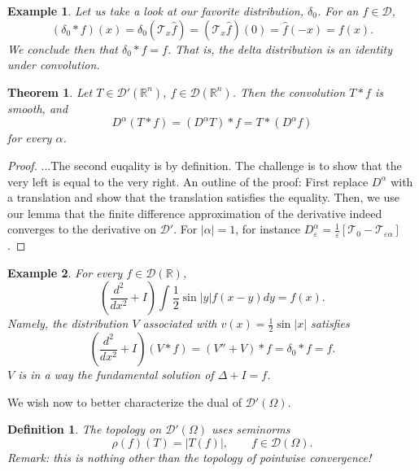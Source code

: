 \documentclass[letterpaper,twoside,11pt]{article}
\theoremstyle{mystyle}
\newtheorem{theorem}{Theorem}[section]
\newtheorem{definition}{Definition}[section]
\newtheorem*{example}{Example}
\newcommand{\R}{{\mathbb R}}
\newcommand{\DD}{\mathcal D}
\newcommand{\cg}{\color{gray}}
\newcommand{\cbk}{\color{black}}
\begin{document}
  \begin{example}
    Let us take a look at our favorite distribution, $\delta_0$. For an $f \in \DD$, 
    \[\left( \delta_0 \ast f \right)(x) = \delta_0\left( \mathcal T_x \hat f \right)  = \left( \mathcal T_x \hat f \right)(0) = \hat f (-x) = f(x) .\]
    We conclude then that $\delta_0 \ast f = f$. That is, the delta distribution is an identity under convolution. 
  \end{example}

\begin{tcolorbox}[colback=red!5!white,colframe=red!75!black]
\begin{theorem}
  Let $T \in \DD'(\R^n)$, $f \in \DD(\R^n)$. Then the convolution $T\ast f$ is smooth, and 
  \[D^\alpha\left( T\ast f  \right) = \left( D^\alpha T \right)\ast f = T\ast \left( D^\alpha f \right)\] for every $\alpha$. 
\end{theorem}
\end{tcolorbox}

\begin{proof}
  ...The second euqality is by definition. The challenge is to show that the very left is equal to the very right. An outline of the proof: 
  First replace $D^\alpha$ with a translation and show that the translation satisfies the equality. Then, we use our lemma that the finite difference approximation of the derivative indeed converges to the derivative on $\DD'$. For $|\alpha| = 1$, for instance $D^\alpha_\varepsilon = \frac{1}{\varepsilon}\left[ \mathcal T_0 - \mathcal T_{\varepsilon\alpha} \right] $. 
\end{proof}

\begin{example}
  For every $f \in \DD(\R)$, 
  \[\left( \frac{d^2}{dx^2}+ I  \right) \int \frac{1}{2}\sin|y| f(x-y) dy = f(x) .\]
  Namely, the distribution $V$ associated with $v(x) = \frac{1}{2}\sin|x|$ satisfies 
  \[\left( \frac{d^2}{dx^2}+ I  \right) \left( V\ast f \right) = \left( V'' + V \right)\ast f = \delta_0 \ast f = f .\]
  $V$ is in a way the fundamental solution of $\Delta + I = f$. 

\end{example}

We wish now to better characterize the dual of $\DD' (\Omega )$. 
\begin{definition}
  The topology on $\DD'(\Omega)$ uses seminorms 
  \[\rho(f)(T) = |T(f)|, \qquad f\in \DD(\Omega).\]
  \cg Remark: this is nothing other than the topology of pointwise convergence! \cbk  
\end{definition}
\end{document}
